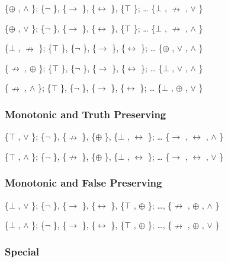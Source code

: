 \{$\oplus$ , $\land$ \}; \{$\neg$ \}, \{$\to$ \}, \{$\leftrightarrow$ \}, \{$\top$ \}; \ldots{} \{$\bot$ , $\nrightarrow$ , $\lor$ \}

\{$\oplus$ , $\lor$ \}; \{$\neg$ \}, \{$\to$ \}, \{$\leftrightarrow$ \}, \{$\top$ \}; \ldots{} \{$\bot$ , $\nrightarrow$ , $\land$ \}

\{$\bot$ , $\nrightarrow$ \}; \{$\top$ \}, \{$\neg$ \}, \{$\to$ \}, \{$\leftrightarrow$ \}; \ldots{} \{$\oplus$ , $\lor$ , $\land$ \}

\{$\nrightarrow$ , $\oplus$ \}; \{$\top$ \}, \{$\neg$ \}, \{$\to$ \}, \{$\leftrightarrow$ \}; \ldots{} \{$\bot$ , $\lor$ , $\land$ \}

\{$\nrightarrow$ , $\land$ \}; \{$\top$ \}, \{$\neg$ \}, \{$\to$ \}, \{$\leftrightarrow$ \}; \ldots{} \{$\bot$ , $\oplus$ , $\lor$ \}

\hypertarget{monotonic-and-truth-preserving}{%
\subsubsection{Monotonic and Truth
Preserving}\label{monotonic-and-truth-preserving}}

\{$\top$ , $\lor$ \}; \{$\neg$ \}, \{$\nrightarrow$ \}, \{$\oplus$ \}, \{$\bot$ , $\leftrightarrow$ \}; \ldots{} \{$\to$ , $\leftrightarrow$ , $\land$ \}

\{$\top$ , $\land$ \}; \{$\neg$ \}, \{$\nrightarrow$ \}, \{$\oplus$ \}, \{$\bot$ , $\leftrightarrow$ \}; \ldots{} \{$\to$ , $\leftrightarrow$ , $\lor$ \}

\hypertarget{monotonic-and-false-preserving}{%
\subsubsection{Monotonic and False
Preserving}\label{monotonic-and-false-preserving}}

\{$\bot$ , $\lor$ \}; \{$\neg$ \}, \{$\to$ \}, \{$\leftrightarrow$ \}, \{$\top$ , $\oplus$ \}; \ldots, \{$\nrightarrow$ , $\oplus$ , $\land$ \}

\{$\bot$ , $\land$ \}; \{$\neg$ \}, \{$\to$ \}, \{$\leftrightarrow$ \}, \{$\top$ , $\oplus$ \}; \ldots, \{$\nrightarrow$ , $\oplus$ , $\lor$ \}

\hypertarget{section}{%
\subsubsection{}\label{section}}

\hypertarget{special}{%
\subsubsection{Special}\label{special}}

